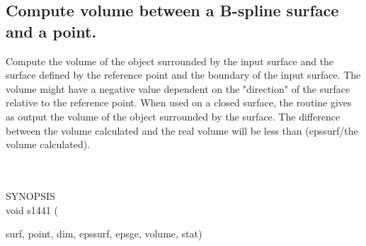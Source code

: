 \subsection{Compute volume between a B-spline surface and a point.}
\begin{minipg1}
Compute the volume of the object surrounded by the input surface and the 
surface defined by the reference point and the boundary of the input surface. The 
volume might have a negative value dependent on the "direction" of the surface 
relative to the reference point. When used on a closed surface, the routine 
gives as output the volume of the object surrounded by the surface. The 
difference between the volume calculated and the real volume will be less than 
(epssurf/the volume calculated).
\end{minipg1} \\ \\
SYNOPSIS\\
	\>void s1441	(\begin{minipg3}
				{\fov surf}, {\fov point}, {\fov dim}, {\fov epssurf}, {\fov epsge}, {\fov volume}, {\fov stat})
		\end{minipg3}\\[0.3ex]

